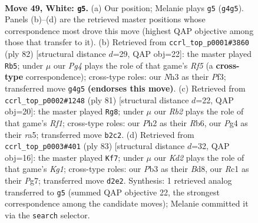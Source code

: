 \documentclass[11pt]{article}
\begin{document}
\clearpage

\begin{figure}[p]\centering
\begin{subfigure}{0.46\textwidth}\centering
\resizebox{\linewidth}{!}{%
\newchessgame
\chessboard[
  setfen={3r1k2/1r3p1p/8/p7/3p2P1/1P5N/1R1K3P/2R5 w - - 0 49},
  showmover=false,
  pgfstyle=straightmove, color=movearrow, markmove={g4-g5}
]}
\caption{}
\end{subfigure}\hfill
\begin{subfigure}{0.46\textwidth}\centering
\resizebox{\linewidth}{!}{%
\newchessgame
\chessboard[
  setfen={4r1k1/7p/8/5R2/Pp1r4/4pP2/6P1/4R1K1 w - - 0 42},
  showmover=false,
  pgfstyle=straightmove, color=movearrow, markmove={f5-b5}
]}
\caption{}
\end{subfigure}
\\[4pt]
\begin{subfigure}{0.46\textwidth}\centering
\resizebox{\linewidth}{!}{%
\newchessgame
\chessboard[
  setfen={5r1k/7p/1r6/RP3p2/3p4/3P1R1K/7P/8 b - - 1 41},
  showmover=false,
  pgfstyle=straightmove, color=movearrow, markmove={f8-g8}
]}
\caption{}
\end{subfigure}\hfill
\begin{subfigure}{0.46\textwidth}\centering
\resizebox{\linewidth}{!}{%
\newchessgame
\chessboard[
  setfen={R2b2k1/6pp/8/8/8/P4PP1/3rn2P/5R1K b - - 7 42},
  showmover=false,
  pgfstyle=straightmove, color=movearrow, markmove={g8-f7}
]}
\caption{}
\end{subfigure}
\caption{\textbf{Move 49, White: \texttt{g5}.} (a) Our position; Melanie plays \texttt{g5} (\texttt{g4g5}). Panels (b)--(d) are the retrieved master positions whose correspondence most drove this move (highest QAP objective among those that transfer to it). (b) Retrieved from \texttt{ccrl\_top\_p0001\#3860} (ply 82) [structural distance $d$=29, QAP obj=22]: the master played \texttt{Rb5}; under $\mu$ our \emph{Pg4} plays the role of that game's \emph{Rf5} (a \textbf{cross-type} correspondence); cross-type roles: our \emph{N}h3 as their \emph{P}f3; transferred move \texttt{g4g5} \textbf{(endorses this move)}. (c) Retrieved from \texttt{ccrl\_top\_p0002\#1248} (ply 81) [structural distance $d$=22, QAP obj=20]: the master played \texttt{Rg8}; under $\mu$ our \emph{Rb2} plays the role of that game's \emph{Rf1}; cross-type roles: our \emph{P}h2 as their \emph{R}b6, our \emph{P}g4 as their \emph{r}a5; transferred move \texttt{b2c2}. (d) Retrieved from \texttt{ccrl\_top\_p0003\#401} (ply 83) [structural distance $d$=32, QAP obj=16]: the master played \texttt{Kf7}; under $\mu$ our \emph{Kd2} plays the role of that game's \emph{Kg1}; cross-type roles: our \emph{P}b3 as their \emph{B}d8, our \emph{R}c1 as their \emph{P}g7; transferred move \texttt{d2e2}. Synthesis: 1 retrieved analog transferred to \texttt{g5} (summed QAP objective 22, the strongest correspondence among the candidate moves); Melanie committed it via the \texttt{search} selector.}
\label{fig:thought-m96}
\end{figure}
\end{document}
